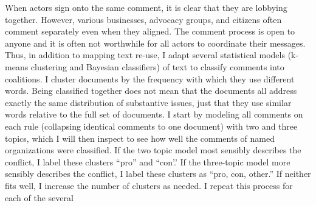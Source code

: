 When actors sign onto the same comment, it is clear that they are lobbying together. %
However, various businesses, advocacy groups, and citizens often comment separately even when they aligned. The comment process is open to anyone and it is often not worthwhile for all actors to coordinate their messages. 
Thus, in addition to mapping text re-use, I adapt several statistical models (k-means clustering and Bayesian classifiers) of text to classify comments into coalitions. %
I cluster documents by the frequency with which they use different words. Being classified together does not mean that the documents all address exactly the same distribution of substantive issues, just that they use similar words relative to the full set of documents.
I start by modeling all comments on each rule (collapsing identical comments to one document) with two and three topics, which I will then inspect to see how well the comments of named organizations were classified. If the two topic model most sensibly describes the conflict, I label these clusters ``pro'' and ``con'.' If the three-topic model more sensibly describes the conflict, I label these clusters as ``pro, con, other.'' If neither fits well, I increase the number of clusters as needed. I repeat this process for each of the several 




